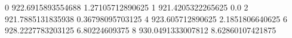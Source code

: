 0 922.6915893554688 1.27105712890625
1 921.4205322265625 0.0
2 921.7885131835938 0.36798095703125
4 923.605712890625 2.1851806640625
6 928.2227783203125 6.80224609375
8 930.0491333007812 8.62860107421875
